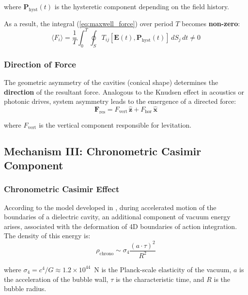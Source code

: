 \documentclass[12pt,a4paper]{article}
\begin{document}
where $\bm{P}_{\text{hyst}}(t)$ is the hysteretic component depending on the field history.

As a result, the integral (\ref{eq:maxwell_force}) over period $T$ becomes \textbf{non-zero}:
\begin{equation}
    \langle F_i \rangle = \frac{1}{T} \int_0^T \oint_S T_{ij}[\bm{E}(t), \bm{P}_{\text{hyst}}(t)] \, dS_j \, dt \neq 0
    \label{eq:nonzero_force}
\end{equation}

\subsubsection{Direction of Force}

The geometric asymmetry of the cavities (conical shape) determines the \textbf{direction} of the resultant force. Analogous to the Knudsen effect in acoustics or photonic drives, system asymmetry leads to the emergence of a directed force:
\begin{equation}
    \bm{F}_{\text{res}} = F_{\text{vert}} \, \hat{\bm{z}} + F_{\text{hor}} \, \hat{\bm{x}}
    \label{eq:force_direction}
\end{equation}

where $F_{\text{vert}}$ is the vertical component responsible for levitation.

\subsection{Mechanism III: Chronometric Casimir Component}

\subsubsection{Chronometric Casimir Effect}

According to the model developed in \cite{chrono_casimir, fermi_1923}, during accelerated motion of the boundaries of a dielectric cavity, an additional component of vacuum energy arises, associated with the deformation of 4D boundaries of action integration. The density of this energy is:
\begin{equation}
    \rho_{\text{chrono}} \sim \sigma_4 \frac{(a \cdot \tau)^2}{R^2}
    \label{eq:chrono_density}
\end{equation}

where $\sigma_4 = c^4/G \approx 1.2 \times 10^{44}$~N is the Planck-scale elasticity of the vacuum, $a$ is the acceleration of the bubble wall, $\tau$ is the characteristic time, and $R$ is the bubble radius.
\end{document}
